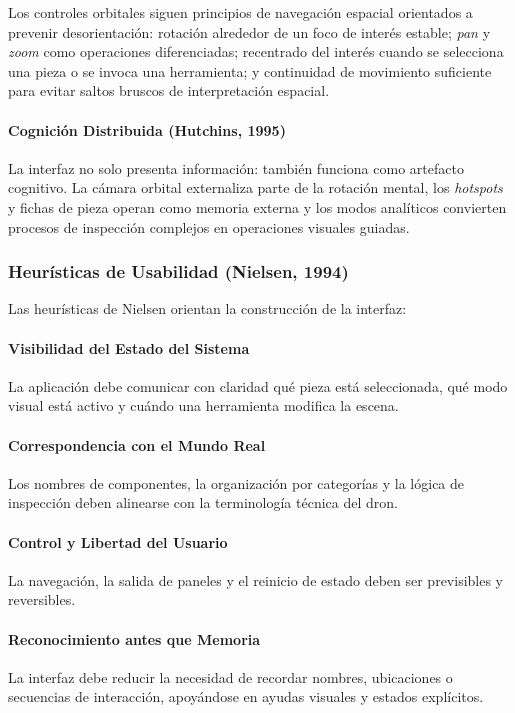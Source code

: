 Los controles orbitales siguen principios de navegación espacial orientados a prevenir desorientación: rotación alrededor de un foco de interés estable; \textit{pan} y \textit{zoom} como operaciones diferenciadas; recentrado del interés cuando se selecciona una pieza o se invoca una herramienta; y continuidad de movimiento suficiente para evitar saltos bruscos de interpretación espacial.

\paragraph{Cognición Distribuida (Hutchins, 1995)} La interfaz no solo presenta información: también funciona como artefacto cognitivo. La cámara orbital externaliza parte de la rotación mental, los \textit{hotspots} y fichas de pieza operan como memoria externa y los modos analíticos convierten procesos de inspección complejos en operaciones visuales guiadas.

\subsubsection{Heurísticas de Usabilidad (Nielsen, 1994)}

Las heurísticas de Nielsen orientan la construcción de la interfaz:

\paragraph{Visibilidad del Estado del Sistema} La aplicación debe comunicar con claridad qué pieza está seleccionada, qué modo visual está activo y cuándo una herramienta modifica la escena.

\paragraph{Correspondencia con el Mundo Real} Los nombres de componentes, la organización por categorías y la lógica de inspección deben alinearse con la terminología técnica del dron.

\paragraph{Control y Libertad del Usuario} La navegación, la salida de paneles y el reinicio de estado deben ser previsibles y reversibles.

\paragraph{Reconocimiento antes que Memoria} La interfaz debe reducir la necesidad de recordar nombres, ubicaciones o secuencias de interacción, apoyándose en ayudas visuales y estados explícitos.


